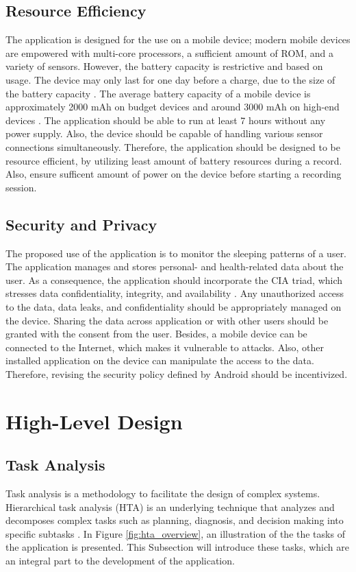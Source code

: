 \subsection{Resource Efficiency}
The application is designed for the use on a mobile device; modern mobile devices are empowered with multi-core processors, a sufficient amount of ROM, and a variety of sensors. However, the battery capacity is restrictive and based on usage. The device may only last for one day before a charge, due to the size of the battery capacity \cite{androidbattery}. The average battery capacity of a mobile device is approximately 2000 mAh on budget devices and around 3000 mAh on high-end devices \cite{androidbatteryavg}. The application should be able to run at least 7 hours without any power supply. Also, the device should be capable of handling various sensor connections simultaneously. Therefore, the application should be designed to be resource efficient, by utilizing least amount of battery resources during a record. Also, ensure sufficent amount of power on the device before starting a recording session.  

\subsection{Security and Privacy}
The proposed use of the application is to monitor the sleeping patterns of a user. The application manages and stores personal- and health-related data about the user. As a consequence, the application should incorporate the CIA triad, which stresses data confidentiality, integrity, and availability \cite{cia}. Any unauthorized access to the data, data leaks, and confidentiality should be appropriately managed on the device. Sharing the data across application or with other users should be granted with the consent from the user.  Besides, a mobile device can be connected to the Internet, which makes it vulnerable to attacks. Also, other installed application on the device can manipulate the access to the data. Therefore, revising the security policy defined by Android \cite{androidsecurity} should be incentivized. 

\section{High-Level Design}

\subsection{Task Analysis}
Task analysis is a methodology to facilitate the design of complex systems. Hierarchical task analysis (HTA) is an underlying technique that analyzes and decomposes complex tasks such as planning, diagnosis, and decision making into specific subtasks \cite{ta}. In Figure \ref{fig:hta_overview}, an illustration of the the tasks of the application is presented. This Subsection will introduce these tasks, which are an integral part to the development of the application.

